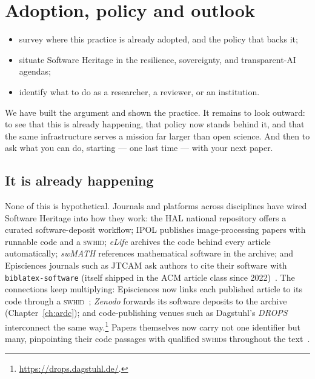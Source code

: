 \chapter{Adoption, policy and outlook}
\label{ch:outlook}


\begin{objectives}\small
\begin{itemize}[nosep,leftmargin=*]
  \item survey where this practice is already adopted, and the policy that backs it;
  \item situate Software Heritage in the resilience, sovereignty, and transparent-AI agendas;
  \item identify what to do as a researcher, a reviewer, or an institution.
\end{itemize}
\end{objectives}

We have built the argument and shown the practice. It remains to look outward: to see that this is
already happening, that policy now stands behind it, and that the same infrastructure serves a
mission far larger than open science. And then to ask what you can do, starting --- one last time
--- with your next paper.


\section{It is already happening}

None of this is hypothetical. Journals and platforms across disciplines have wired Software Heritage
into how they work: the HAL national repository offers a curated software-deposit workflow; IPOL
publishes image-processing papers with runnable code and a \textsc{swhid}; \emph{eLife} archives the code
behind every article automatically; \emph{swMATH} references mathematical software in the archive;
and Episciences journals such as JTCAM ask authors to cite their software with
\texttt{biblatex-software} (itself shipped in the ACM article class since
2022)~\autocite{SwhCACM2018}. The connections keep multiplying: Episciences now links each published
article to its code through a \textsc{swhid}~\autocite{episciences2025swh}; \emph{Zenodo} forwards
its software deposits to the archive (Chapter~\ref{ch:ardc}); and code-publishing venues such as
Dagstuhl's \emph{DROPS} interconnect the same way.\footnote{\url{https://drops.dagstuhl.de/}.} Papers
themselves now carry not one identifier but many, pinpointing their code passages with qualified
\textsc{swhid}s throughout the text~\autocite{spinellis2026hotspots}.

